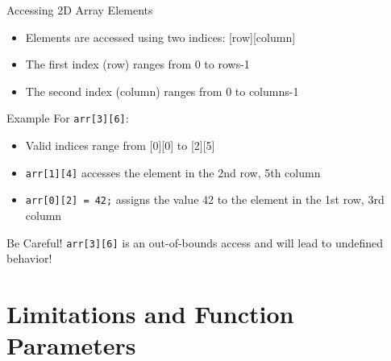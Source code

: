 \documentclass{beamer}
\begin{document}
\begin{frame}{Accessing 2D Array Elements}
    \begin{itemize}
        \item Elements are accessed using two indices: [row][column]
        \item The first index (row) ranges from 0 to rows-1
        \item The second index (column) ranges from 0 to columns-1
    \end{itemize}
    
    \begin{exampleblock}{Example}
        For \texttt{arr[3][6]}:
        \begin{itemize}
            \item Valid indices range from [0][0] to [2][5]
            \item \texttt{arr[1][4]} accesses the element in the 2nd row, 5th column
            \item \texttt{arr[0][2] = 42;} assigns the value 42 to the element in the 1st row, 3rd column
        \end{itemize}
    \end{exampleblock}
    
    \begin{alertblock}{Be Careful!}
        \texttt{arr[3][6]} is an out-of-bounds access and will lead to undefined behavior!
    \end{alertblock}
\end{frame}

\section{Limitations and Function Parameters}
\end{document}
